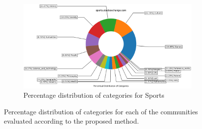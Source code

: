 \begin{figure}[H]
\end{figure}
 
  
\begin{figure}[H]
\ContinuedFloat

    \begin{subfigure}{0.9\textwidth}
    \centering
        \includegraphics[width=1\linewidth]{imgs/percentual-distribution/sports_stackexchange_com_donut}
        \caption{Percentage distribution of categories for Sports}
        \label{fig:path-sports}
    \end{subfigure}
   
 
    \caption{Percentage distribution of categories for each of the communities evaluated according to the proposed method. }
    \label{fig:complete-percentage-distribution}
    
\end{figure}
